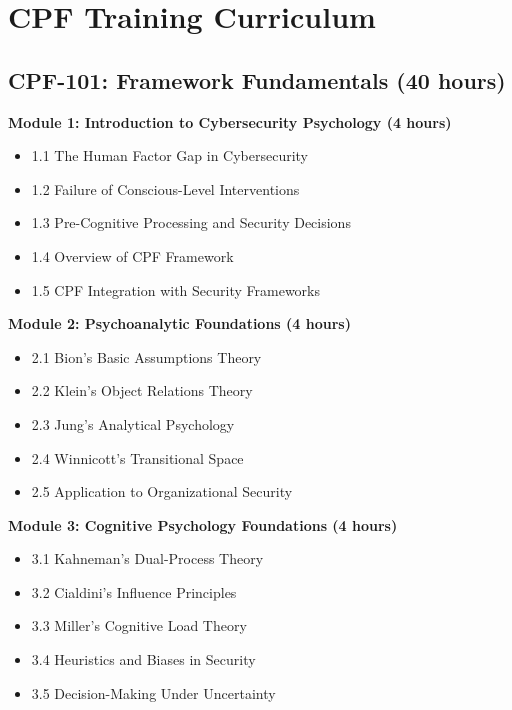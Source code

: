 \documentclass[11pt,a4paper]{article}
\begin{document}
\section{CPF Training Curriculum}

\subsection{CPF-101: Framework Fundamentals (40 hours)}

\textbf{Module 1: Introduction to Cybersecurity Psychology (4 hours)}
\begin{itemize}
\item 1.1 The Human Factor Gap in Cybersecurity
\item 1.2 Failure of Conscious-Level Interventions
\item 1.3 Pre-Cognitive Processing and Security Decisions
\item 1.4 Overview of CPF Framework
\item 1.5 CPF Integration with Security Frameworks
\end{itemize}

\textbf{Module 2: Psychoanalytic Foundations (4 hours)}
\begin{itemize}
\item 2.1 Bion's Basic Assumptions Theory
\item 2.2 Klein's Object Relations Theory
\item 2.3 Jung's Analytical Psychology
\item 2.4 Winnicott's Transitional Space
\item 2.5 Application to Organizational Security
\end{itemize}

\textbf{Module 3: Cognitive Psychology Foundations (4 hours)}
\begin{itemize}
\item 3.1 Kahneman's Dual-Process Theory
\item 3.2 Cialdini's Influence Principles
\item 3.3 Miller's Cognitive Load Theory
\item 3.4 Heuristics and Biases in Security
\item 3.5 Decision-Making Under Uncertainty
\end{itemize}
\end{document}

